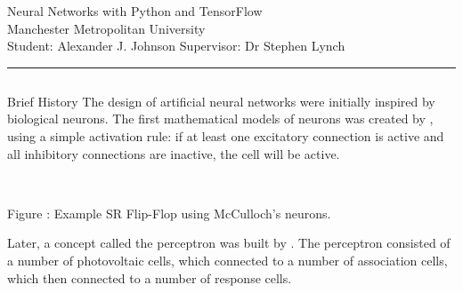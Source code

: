 \documentclass[final]{beamer}
\newcommand{\rfig}[3][1em]{%
    \refstepcounter{figure}
    \vspace{1cm}
    \begin{center}
        #2
        \vspace{#1}\\
        \parbox{0.8\columnwidth}{\centering Figure \thefigure: #3}
    \end{center}
    \vspace{1cm}
}
\begin{document}
\begin{frame}[t]
\begin{center}
    \Large Neural Networks with Python and TensorFlow\\
    \large Manchester Metropolitan University\\
    Student: Alexander J. Johnson \hspace{2cm} Supervisor: Dr Stephen Lynch
\end{center}

\rule{\textwidth}{1pt}
\vspace{5mm}

\begin{columns}
\begin{column}[t]{0.3\textwidth}

    \begin{block}{Brief History}
        The design of artificial neural networks were initially inspired by
        biological neurons.
        The first mathematical models of neurons was created by
        \cite{McCulloch:1943:Logical}, using a simple activation rule: if at
        least one excitatory connection is active and all inhibitory connections
        are inactive, the cell will be active.
        \rfig{}{%
            Example SR Flip-Flop using McCulloch's neurons.
        }
        Later, a concept called the perceptron was built by
        \cite{Rosenblatt:1958:Perceptron}.
        The perceptron consisted of a number of photovoltaic cells, which
        connected to a number of association cells, which then connected to a
        number of response cells.


\end{block}
\end{column}
\end{columns}
\end{frame}
\end{document}
